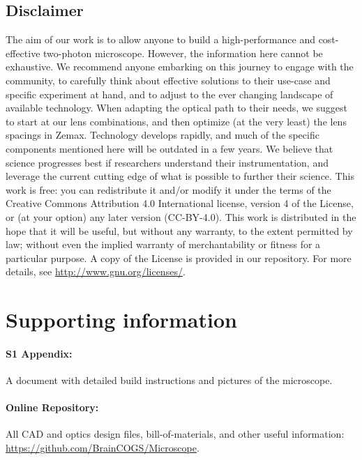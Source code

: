 \documentclass[10pt,letterpaper]{article}
\begin{document}
\subsection*{Disclaimer}
The aim of our work is to allow anyone to build a high-performance and cost-effective two-photon microscope. However, the information here cannot be exhaustive. We recommend anyone embarking on this journey to engage with the community, to carefully think about effective solutions to their use-case and specific experiment at hand, and to adjust to the ever changing landscape of available technology. When adapting the optical path to their needs, we suggest to start at our lens combinations, and then optimize (at the very least) the lens spacings in Zemax. Technology develops rapidly, and much of the specific components mentioned here will be outdated in a few years. We believe that science progresses best if researchers understand their instrumentation, and leverage the current cutting edge of what is possible to further their science.\newline
This work is free: you can redistribute it and/or modify it under the terms of the Creative Commons Attribution 4.0 International license, version 4 of the License, or (at your option) any later version (CC-BY-4.0). This work is distributed in the hope that it will be useful, but without any warranty, to the extent permitted by law; without even the implied warranty of merchantability or fitness for a particular purpose. A copy of the License is provided in our repository.  For more details, see \url{http://www.gnu.org/licenses/}.

\section*{Supporting information}

\paragraph*{S1 Appendix:}
\label{S1_Appendix}
A document with detailed build instructions and pictures of the microscope.

\paragraph*{\bf Online Repository:} 
\label{repository}
All CAD and optics design files, bill-of-materials, and other useful information: \url{https://github.com/BrainCOGS/Microscope}.
\end{document}
